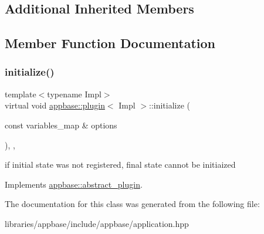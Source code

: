 \subsection*{Additional Inherited Members}


\subsection{Member Function Documentation}
\mbox{\label{classappbase_1_1plugin_ac28755a82831d41e5d0ef0ce56b10fa9}} 
\subsubsection{\texorpdfstring{initialize()}{initialize()}}
{\footnotesize\ttfamily template$<$typename Impl$>$ \\
virtual void \mbox{\hyperlink{classappbase_1_1plugin}{appbase\+::plugin}}$<$ Impl $>$\+::initialize (\begin{DoxyParamCaption}\item[{const variables\+\_\+map \&}]{options }\end{DoxyParamCaption})\hspace{0.3cm}{\ttfamily [inline]}, {\ttfamily [override]}, {\ttfamily [virtual]}}

if initial state was not registered, final state cannot be initiaized 

Implements \mbox{\hyperlink{classappbase_1_1abstract__plugin}{appbase\+::abstract\+\_\+plugin}}.



The documentation for this class was generated from the following file\+:\begin{DoxyCompactItemize}
\item 
libraries/appbase/include/appbase/application.\+hpp\end{DoxyCompactItemize}
